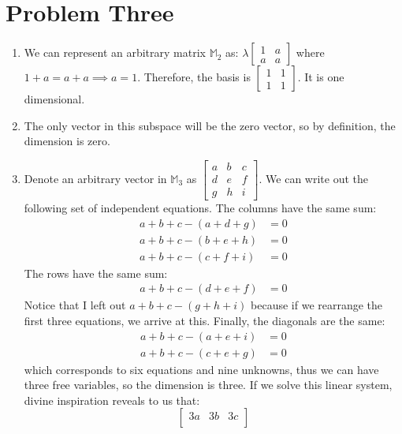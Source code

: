 \documentclass{article}
\begin{document}
\section*{Problem Three}
\begin{enumerate}[label=(\alph*)]
    \item We can represent an arbitrary matrix $\mathbb{M}_2$ as: $\lambda \begin{bmatrix}
        1 & a \\ a & a
    \end{bmatrix}$ where $1+a=a+a \implies a=1$. Therefore, the basis is $\begin{bmatrix}
        1&1\\ 1&1
    \end{bmatrix}$. It is one dimensional.
    \item The only vector in this subspace will be the zero vector, so by definition, the dimension is zero.
    \item Denote an arbitrary vector in $\mathbb{M}_3$ as $\begin{bmatrix}
        a&b&c \\ d&e&f \\ g&h&i
    \end{bmatrix}$. We can write out the following set of independent equations. The columns have the same sum:
    \begin{align}
        a + b + c - (a + d + g) &= 0 \\ 
        a + b + c - (b + e + h) &= 0 \\ 
        a + b + c - (c + f + i) &= 0
    \end{align}
    The rows have the same sum:
    \begin{align}
        a + b + c - (d + e + f) &= 0
    \end{align}
    Notice that I left out $a+b+c-(g+h+i)$ because if we rearrange the first three equations, we arrive at this. Finally, the diagonals are the same:
    \begin{align}
        a + b + c - (a + e + i) &= 0 \\ 
        a + b + c - (c + e + g) &= 0
    \end{align}
    which corresponds to six equations and nine unknowns, thus we can have three free variables, so the dimension is three. If we solve this linear system, divine inspiration reveals to us that:
    \begin{equation}
        \begin{bmatrix}
            3a & 3b & 3c \\ 

\end{bmatrix}
\end{equation}
\end{enumerate}
\end{document}
